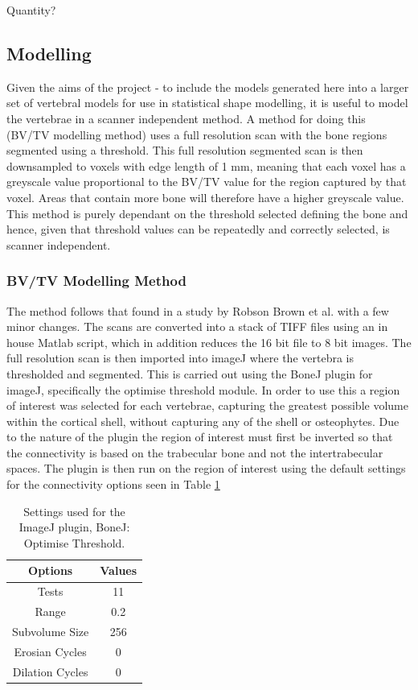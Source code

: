 Quantity?


\subsection{Modelling}

Given the aims of the project - to include the models generated here into a larger set of vertebral models for use in statistical shape modelling, it is useful to model the vertebrae in a scanner independent method.
A method for doing this (BV/TV modelling method) uses a full resolution scan with the bone regions segmented using a threshold.
This full resolution segmented scan is then downsampled to voxels with edge length of 1 mm, meaning that each voxel has a greyscale value proportional to the BV/TV value for the region captured by that voxel.
Areas that contain more bone will therefore have a higher greyscale value.
This method is purely dependant on the threshold selected defining the bone and hence, given that threshold values can be repeatedly and correctly selected, is scanner independent.

\subsubsection{BV/TV Modelling Method}

The method follows that found in a study by Robson Brown et al. \cite{RobsonBrown2014} with a few minor changes.
The scans are converted into a stack of TIFF files using an in house Matlab script, which in addition reduces the 16 bit file to 8 bit images.
The full resolution scan is then imported into imageJ where the vertebra is thresholded and segmented.
This is carried out using the BoneJ plugin for imageJ, specifically the optimise threshold module.
In order to use this a region of interest was selected for each vertebrae, capturing the greatest possible volume within the cortical shell, without capturing any of the shell or osteophytes.
Due to the nature of the plugin the region of interest must first be inverted so that the connectivity is based on the trabecular bone and not the intertrabecular spaces.
The plugin is then run on the region of interest using the default settings for the connectivity options seen in Table \ref{tab:bonej}

\begin{table}[ht!]
	\caption{Settings used for the ImageJ plugin, BoneJ: Optimise Threshold.}
	\label{tab:bonej}
	\centering
	\begin{tabular}{c|c}
	Options & Values \\
	\hline
	\hline
	Tests & 11  \\
	Range & 0.2 \\
	Subvolume Size & 256 \\
	Erosian Cycles & 0 \\
	Dilation Cycles & 0 \\
	\hline
	\end{tabular}
\end{table}

